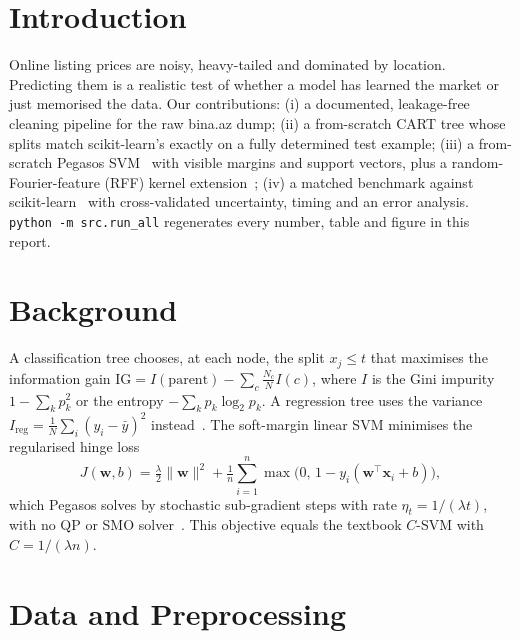 \documentclass[10pt,twocolumn,a4paper]{article}
\begin{document}
\section{Introduction}
Online listing prices are noisy, heavy-tailed and dominated by location. Predicting them is a
realistic test of whether a model has learned the market or just memorised the data. Our contributions:
(i) a documented, leakage-free cleaning pipeline for the raw bina.az dump;
(ii) a from-scratch CART tree whose splits match scikit-learn's exactly on a fully determined test example;
(iii) a from-scratch Pegasos SVM~\cite{pegasos} with visible margins and support vectors, plus a
random-Fourier-feature (RFF) kernel extension~\cite{rff};
(iv) a matched benchmark against scikit-learn~\cite{sklearn} with cross-validated uncertainty,
timing and an error analysis.
\texttt{python -m src.run\_all} regenerates every number, table and figure in this report.

\section{Background}
A classification tree chooses, at each node, the split $x_j\le t$ that maximises the information gain
$\mathrm{IG}=I(\text{parent})-\sum_c \tfrac{N_c}{N} I(c)$, where $I$ is the Gini impurity $1-\sum_k p_k^2$
or the entropy $-\sum_k p_k\log_2 p_k$. A regression tree uses the variance
$I_{\text{reg}}=\tfrac1N\sum_i(y_i-\bar y)^2$ instead~\cite{cart}. The soft-margin linear SVM minimises
the regularised hinge loss
\begin{equation}
  J(\mathbf{w},b)=\tfrac{\lambda}{2}\lVert\mathbf{w}\rVert^{2}
  +\tfrac{1}{n}\sum_{i=1}^{n}\max\!\big(0,\,1-y_i(\mathbf{w}^{\top}\mathbf{x}_i+b)\big),
\end{equation}
which Pegasos solves by stochastic sub-gradient steps with rate $\eta_t=1/(\lambda t)$, with no QP or SMO
solver~\cite{pegasos}. This objective equals the textbook $C$-SVM with $C=1/(\lambda n)$.

\section{Data and Preprocessing}
\end{document}
